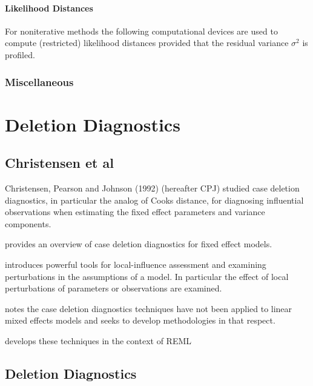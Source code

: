 \documentclass[12pt, a4paper]{report}
\theoremstyle{plain}
\theoremstyle{definition}
\theoremstyle{remark}
\begin{document}
\subsubsection{Likelihood Distances}
For noniterative methods the following computational devices are used to compute (restricted) likelihood distances provided that the residual variance
$\sigma^2$ is profiled.
\subsection{Miscellaneous}



\newpage

	
\chapter{Deletion Diagnostics}	
	\section{Christensen et al}         %
	Christensen, Pearson and Johnson (1992) (hereafter CPJ) studied case deletion diagnostics, in particular the analog of Cooks
	distance, for diagnosing influential observations when estimating
	the fixed effect parameters and variance
	components.
	
	
	
	\citet{Christiansen}provides an overview of case deletion
	diagnostics for fixed effect models.
	
	\citet{cook86} introduces powerful tools for local-influence
	assessment and examining perturbations in the assumptions of a
	model. In particular the effect of local perturbations of
	parameters or observations are examined.
	
	\citet{Christiansen} notes the case deletion diagnostics
	techniques have not been applied to linear mixed effects models
	and seeks to develop methodologies in that respect.
	
	\citet{Christiansen} develops these techniques in the context of
	REML
	
	
	
	
	
\section{Deletion Diagnostics}
\end{document}
